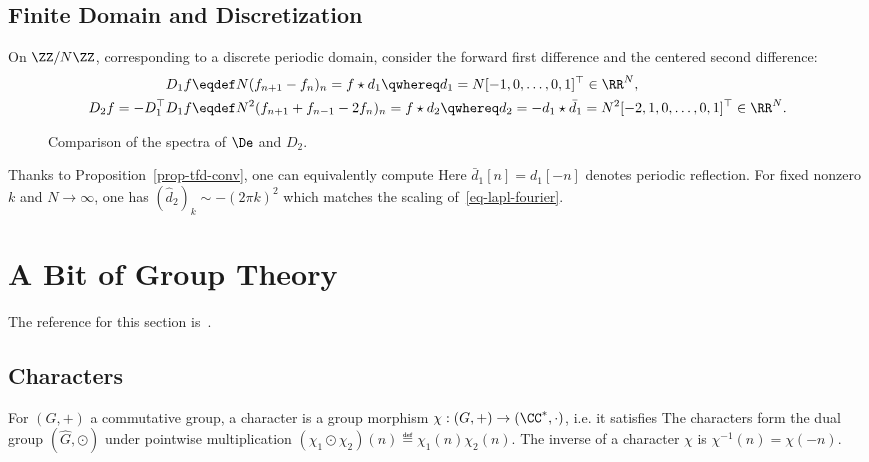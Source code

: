 \subsection{Finite Domain and Discretization}

On $\ZZ/N\ZZ$, corresponding to a discrete periodic domain, consider the forward first difference and the centered second difference:
\begin{align}\label{eq-disc-diff-1}
	D_1 f &\eqdef N(f_{n+1}-f_n)_n=f\star d_1\qwhereq d_1=N[-1,0,\ldots,0,1]^\top \in \RR^N, \\
	\label{eq-disc-diff-2}
	D_2 f=-D_1^\top D_1 f & \eqdef N^2 (f_{n+1}+f_{n-1}-2f_n)_n = f \star d_2 \qwhereq d_2=-d_1\star\bar d_1=N^2[-2,1,0,\ldots,0,1]^\top \in \RR^N.
\end{align}
\begin{figure}[tbp]
\centering
{}
\caption{Comparison of the spectra of $\De$ and $D_2$.}
\label{fig-review-fourier-finite-difference-spectrum}
\end{figure}
Thanks to Proposition~\ref{prop-tfd-conv}, one can equivalently compute
Here $\bar d_1[n]=d_1[-n]$ denotes periodic reflection. For fixed nonzero $k$ and $N\to\infty$, one has $(\hat d_2)_k \sim -(2\pi k)^2$ which matches the scaling of~\eqref{eq-lapl-fourier}.


                                                
                                                
                                                
\section{A Bit of Group Theory}

The reference for this section is~\cite{peyre2004algebre}.

                                                
\subsection{Characters}

For $(G,+)$ a commutative group, a character is a group morphism $\chi : (G,+) \rightarrow (\CC^*,\cdot)$, i.e. it satisfies
The characters form the dual group $(\hat G,\odot)$ under pointwise multiplication $(\chi_1 \odot \chi_2)(n) \eqdef \chi_1(n) \chi_2(n)$. The inverse of a character $\chi$ is $\chi^{-1}(n)=\chi(-n)$.

